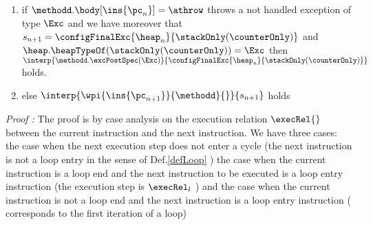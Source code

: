 \begin{lemma}
\begin{enumerate}
	 \item if $\methodd.\body[\ins{\pc_n}] = \athrow $ throws a not handled exception of type $\Exc$
	 and we have moreover that $ s_{n+1} =\configFinalExc{ \heap_{n}}{  \stackOnly (\counterOnly)} $ and $\heap.\heapTypeOf(\stackOnly (\counterOnly) ) = \Exc  $ 
	 then  $\interp{\methodd.\excPostSpec( \Exc)}{\configFinalExc{ \heap_{n}}{  \stackOnly (\counterOnly)   } } $  holds.


%	
	
	
	\item else   $\interp{ \wpi{\ins{\pc_{n+1}}}{\methodd}{  } } { s_{n+1} } $  holds
\end{enumerate}
\end{lemma}

\textit{Proof :}
The proof is by case analysis on the execution relation $\execRel{}$  between the current instruction and the next instruction.
 We have three cases: the case when the next execution step does not enter a cycle (the next instruction is not a loop entry in the sense of Def.\ref{defLoop} )
the case when the current instruction is a loop end and the next instruction to be executed is a loop entry instruction (the execution step is $\execRel_l$ )
and the case when the current instruction is not a loop end and the next instruction is a loop entry instruction ( corresponds to the first iteration of a loop) 

